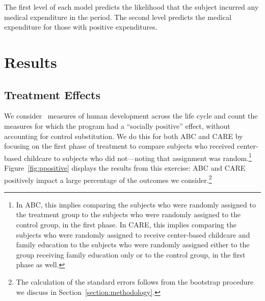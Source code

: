 \noindent The first level of each model predicts the likelihood that the subject incurred any medical expenditure in the period. The second level predicts the medical expenditure for those with positive expenditures.

\section{Results} \label{section:results}

\subsection{Treatment Effects} \label{section:teresults}

\noindent We consider \noutcomes\ measures of human development across the life cycle and count the measures for which the program had a ``socially positive'' effect, without accounting for control substitution. We do this for both ABC and CARE by focusing on the first phase of treatment to compare subjects who received center-based childcare to subjects who did not---noting that assignment was random.\footnote{In ABC, this implies comparing the subjects who were randomly assigned to the treatment group to the subjects who were randomly assigned to the control group, in the first phase. In CARE, this implies comparing the subjects who were randomly assigned to receive center-based childcare and family education to the subjects who were randomly assigned either to the group receiving family education only or to the control group, in the first phase as well.} Figure~\ref{fig:ppositive} displays the results from this exercise: ABC and CARE positively impact a large percentage of the outcomes we consider.\footnote{The calculation of the standard errors follows from the bootstrap procedure we discuss in Section~\ref{section:methodology}.}

